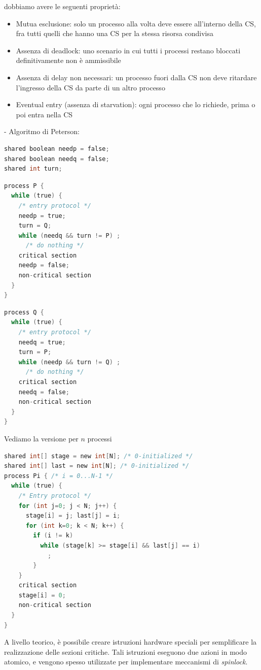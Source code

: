 \documentclass[a4paper,12pt]{article}
\begin{document}
dobbiamo avere le seguenti proprietà:
\begin{itemize}
  \item Mutua esclusione: solo un processo alla volta deve essere all'interno della CS, fra tutti quelli che hanno una CS per la stessa risorsa condivisa
  \item Assenza di deadlock: uno scenario in cui tutti i processi restano bloccati definitivamente non è ammissibile
  \item Assenza di delay non necessari: un processo fuori dalla CS non deve ritardare l'ingresso della CS da parte di un altro processo
  \item Eventual entry (assenza di starvation): ogni processo che lo richiede, prima o poi entra nella CS
\end{itemize}
\vspace{15em}
- Algoritmo di Peterson: \\
\begin{lstlisting}[language=C]
shared boolean needp = false;
shared boolean needq = false;
shared int turn;
\end{lstlisting}
\begin{minipage}{0.48\textwidth}
\begin{lstlisting}[language=C]
process P {
  while (true) {
    /* entry protocol */
    needp = true;
    turn = Q;
    while (needq && turn != P) ; 
      /* do nothing */
    critical section
    needp = false;
    non-critical section
  }
}
\end{lstlisting}
\end{minipage}
\hfill 
\begin{minipage}{0.48\textwidth}
\begin{lstlisting}[language=C]
process Q {
  while (true) {
    /* entry protocol */
    needq = true;
    turn = P;
    while (needp && turn != Q) ; 
      /* do nothing */
    critical section
    needq = false;
    non-critical section
  }
}
\end{lstlisting}
\end{minipage}
Vediamo la versione per $n$ processi
\begin{lstlisting}[language=C]
shared int[] stage = new int[N]; /* 0-initialized */
shared int[] last = new int[N]; /* 0-initialized */
process Pi { /* i = 0...N-1 */
  while (true) {
    /* Entry protocol */
    for (int j=0; j < N; j++) {
      stage[i] = j; last[j] = i;
      for (int k=0; k < N; k++) {
        if (i != k)
          while (stage[k] >= stage[i] && last[j] == i)
            ;
        }
    }
    critical section
    stage[i] = 0;
    non-critical section
  }
}
\end{lstlisting}
\vspace{15em}
A livello teorico, è possibile creare istruzioni hardware speciali per semplificare la realizzazione delle sezioni critiche.  
Tali istruzioni eseguono due azioni in modo atomico, e vengono spesso utilizzate per implementare meccanismi di \textit{spinlock}.
\end{document}
